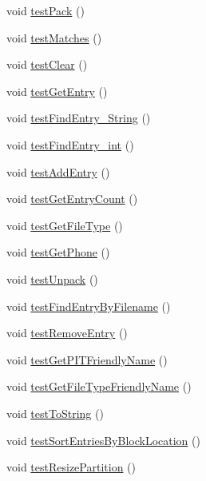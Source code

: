 \begin{DoxyCompactItemize}
\item 
void \hyperlink{classCASUAL_1_1archiving_1_1libpit_1_1PitDataTest_a3ec5b1627a2658066dadc16787c8aa6f}{test\-Pack} ()
\item 
void \hyperlink{classCASUAL_1_1archiving_1_1libpit_1_1PitDataTest_a6460f6baf4f86fd725c678302320ef18}{test\-Matches} ()
\item 
void \hyperlink{classCASUAL_1_1archiving_1_1libpit_1_1PitDataTest_a997343d35441bfba1b38d1673a494f45}{test\-Clear} ()
\item 
void \hyperlink{classCASUAL_1_1archiving_1_1libpit_1_1PitDataTest_af8119beb473ef4e775a7150e4f265b06}{test\-Get\-Entry} ()
\item 
void \hyperlink{classCASUAL_1_1archiving_1_1libpit_1_1PitDataTest_ab5e9db906804c24bdce972af363ac721}{test\-Find\-Entry\-\_\-\-String} ()
\item 
void \hyperlink{classCASUAL_1_1archiving_1_1libpit_1_1PitDataTest_a0399e5a62e86513cad2b34004ad8082b}{test\-Find\-Entry\-\_\-int} ()
\item 
void \hyperlink{classCASUAL_1_1archiving_1_1libpit_1_1PitDataTest_a649f113767782fbb9c7f8dca8a771c4c}{test\-Add\-Entry} ()
\item 
void \hyperlink{classCASUAL_1_1archiving_1_1libpit_1_1PitDataTest_a08e72557128fecc1f2ff30d1ea949e3d}{test\-Get\-Entry\-Count} ()
\item 
void \hyperlink{classCASUAL_1_1archiving_1_1libpit_1_1PitDataTest_afcfc45a7f7be1183df1d73fc2f14fb9c}{test\-Get\-File\-Type} ()
\item 
void \hyperlink{classCASUAL_1_1archiving_1_1libpit_1_1PitDataTest_a65121aeb3055b6821d4f27a90a3cecab}{test\-Get\-Phone} ()
\item 
void \hyperlink{classCASUAL_1_1archiving_1_1libpit_1_1PitDataTest_a6208bd9830ef1948147d5b996a933d8d}{test\-Unpack} ()
\item 
void \hyperlink{classCASUAL_1_1archiving_1_1libpit_1_1PitDataTest_acc0c22d48286e25e684877e41fe31c79}{test\-Find\-Entry\-By\-Filename} ()
\item 
void \hyperlink{classCASUAL_1_1archiving_1_1libpit_1_1PitDataTest_a4b423614f54a172760818ff7862955ea}{test\-Remove\-Entry} ()
\item 
void \hyperlink{classCASUAL_1_1archiving_1_1libpit_1_1PitDataTest_a3774a97243537fccc66526f555f95ca5}{test\-Get\-P\-I\-T\-Friendly\-Name} ()
\item 
void \hyperlink{classCASUAL_1_1archiving_1_1libpit_1_1PitDataTest_a25606b857bee21794e8c1572a0d4ee0b}{test\-Get\-File\-Type\-Friendly\-Name} ()
\item 
void \hyperlink{classCASUAL_1_1archiving_1_1libpit_1_1PitDataTest_a9d025b886ad792244c4f18cd35d58567}{test\-To\-String} ()
\item 
void \hyperlink{classCASUAL_1_1archiving_1_1libpit_1_1PitDataTest_aad5bc53ad568e48db94a0b36d01b1f14}{test\-Sort\-Entries\-By\-Block\-Location} ()
\item 
void \hyperlink{classCASUAL_1_1archiving_1_1libpit_1_1PitDataTest_ac5145bb5dc38c8c102afc66da9ecc5a7}{test\-Resize\-Partition} ()
\end{DoxyCompactItemize}
